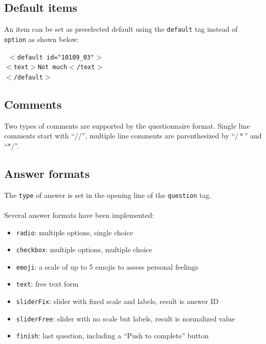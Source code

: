 \documentclass[11pt,a4paper,titlepage]{article}
\begin{document}
\subsection{Default items}

An item can be set as preselected default using the \texttt{default} tag instead of \texttt{option} as shown below:
%
\begin{center}
\begin{tcolorbox}[colback=black!10!white,colframe=black!50!white]
\texttt{
$<$default id="10109\_03"$>$\\
\hspace*{0.5cm}$<$text$>$Not much$<$/text$>$\\
$<$/default$>$}
\end{tcolorbox}
\end{center}

\subsection{Comments}

Two types of comments are supported by the questionnaire format. Single line comments start with ``//'', multiple line comments are parenthesized by ``\texttt{$/*$}'' and ``\texttt{$*/$}''.

\clearpage

\subsection{Answer formats}\label{sub:format}

The \texttt{type} of answer is set in the opening line of the \texttt{question} tag.\\
\\
Several answer formats have been implemented:
\begin{itemize}
	\item \texttt{radio}: multiple options, single choice
	\item \texttt{checkbox}: multiple options, multiple choice
	\item \texttt{emoji}: a scale of up to 5 emojis to assess personal feelings
	\item \texttt{text}: free text form
	\item \texttt{sliderFix}: slider with fixed scale and labels, result is answer ID
	\item \texttt{sliderFree}: slider with no scale but labels, result is normalized value
	\item \texttt{finish}: last question, including a ``Push to complete'' button
\end{itemize}
\end{document}
